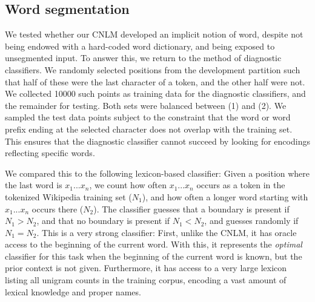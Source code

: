 \subsection{Word segmentation}
\label{sec:segmentation}







We tested whether our CNLM developed an implicit notion of word, despite not being endowed with a hard-coded word dictionary, and being exposed to unsegmented input. %
To answer this, we return to the method of diagnostic classifiers.
We randomly selected positions from the development partition such that half of these were the last character of a token, and the other half were not.
We collected 10000 such points as training data for the diagnostic classifiers, and the remainder for testing.
Both sets were balanced between (1) and (2).
We sampled the test data points subject to the constraint that the word or word prefix ending at the selected character does not overlap with the training set.
This ensures that the diagnostic classifier cannot succeed by looking for encodings reflecting specific words.



We compared this to the following lexicon-based classifier:
Given a position where the last word is $x_1...x_n$, we count how often $x_1...x_n$ occurs as a token in the tokenized Wikipedia training set ($N_1$), and how often a longer word starting with $x_1...x_n$ occurs there ($N_2$).
The classifier guesses that a boundary is present if $N_1 > N_2$, and that no boundary is present if $N_1 < N_2$, and guesses randomly if $N_1 = N_2$.
This is a very strong classifier:
First, unlike the CNLM, it has oracle access to the beginning of the current word.
With this, it represents the \emph{optimal} classifier for this task when the beginning of the current word is known, but the prior context is not given.
Furthermore, it has access to a very large lexicon listing all unigram counts in the training corpus, encoding a vast amount of lexical knowledge and proper names.

